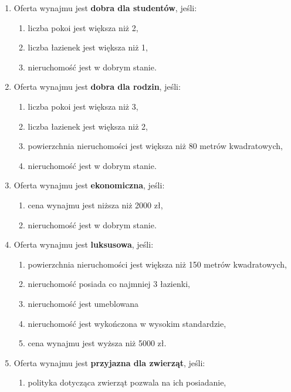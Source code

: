 \begin{enumerate}[label=W\arabic*.]
    \item Oferta wynajmu jest \textbf{dobra dla studentów}, jeśli:
    \begin{enumerate}[label=\arabic*.]
        \item liczba pokoi jest większa niż 2,
        \item liczba łazienek jest większa niż 1,
        \item nieruchomość jest w dobrym stanie.
    \end{enumerate}
    \item Oferta wynajmu jest \textbf{dobra dla rodzin}, jeśli:
    \begin{enumerate}[label=\arabic*.]
        \item liczba pokoi jest większa niż 3,
        \item liczba łazienek jest większa niż 2,
        \item powierzchnia nieruchomości jest większa niż 80 metrów kwadratowych,
        \item nieruchomość jest w dobrym stanie.
    \end{enumerate}
    \item Oferta wynajmu jest \textbf{ekonomiczna}, jeśli:
    \begin{enumerate}[label=\arabic*.]
        \item cena wynajmu jest niższa niż 2000 zł,
        \item nieruchomość jest w dobrym stanie.
    \end{enumerate}
    \item Oferta wynajmu jest \textbf{luksusowa}, jeśli:
    \begin{enumerate}[label=\arabic*.]
        \item powierzchnia nieruchomości jest większa niż 150 metrów kwadratowych,
        \item nieruchomość posiada co najmniej 3 łazienki,
        \item nieruchomość jest umeblowana
        \item nieruchomość jest wykończona w wysokim standardzie,
        \item cena wynajmu jest wyższa niż 5000 zł.
    \end{enumerate}
    \item Oferta wynajmu jest \textbf{przyjazna dla zwierząt}, jeśli:
    \begin{enumerate}[label=\arabic*.]
        \item polityka dotycząca zwierząt pozwala na ich posiadanie,

\end{enumerate}
\end{enumerate}
